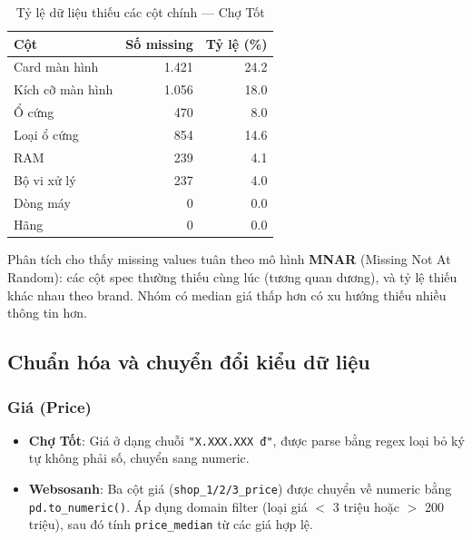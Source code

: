 \begin{table}[H]
    \centering
    \caption{Tỷ lệ dữ liệu thiếu các cột chính --- Chợ Tốt}
    \label{tab:missing-chotot}
    \begin{tabular}{lrr}
        \toprule
        \textbf{Cột} & \textbf{Số missing} & \textbf{Tỷ lệ (\%)} \\
        \midrule
        Card màn hình       & 1.421 & 24.2 \\
        Kích cỡ màn hình    & 1.056 & 18.0 \\
        Ổ cứng              & 470   & 8.0  \\
        Loại ổ cứng         & 854   & 14.6 \\
        RAM                 & 239   & 4.1  \\
        Bộ vi xử lý         & 237   & 4.0  \\
        Dòng máy            & 0     & 0.0  \\
        Hãng                & 0     & 0.0  \\
        \bottomrule
    \end{tabular}
\end{table}

Phân tích cho thấy missing values tuân theo mô hình \textbf{MNAR} (Missing Not At Random)\cite{rubin1976missing}: các cột spec thường thiếu cùng lúc (tương quan dương), và tỷ lệ thiếu khác nhau theo brand. Nhóm có median giá thấp hơn có xu hướng thiếu nhiều thông tin hơn.

\subsection{Chuẩn hóa và chuyển đổi kiểu dữ liệu}

\subsubsection{Giá (Price)}
\begin{itemize}[noitemsep]
    \item \textbf{Chợ Tốt}: Giá ở dạng chuỗi \texttt{"X.XXX.XXX đ"}, được parse bằng regex loại bỏ ký tự không phải số, chuyển sang numeric.
    \item \textbf{Websosanh}: Ba cột giá (\texttt{shop\_1/2/3\_price}) được chuyển về numeric bằng \texttt{pd.to\_numeric()}. Áp dụng domain filter (loại giá $<$ 3 triệu hoặc $>$ 200 triệu), sau đó tính \texttt{price\_median} từ các giá hợp lệ.
\end{itemize}

